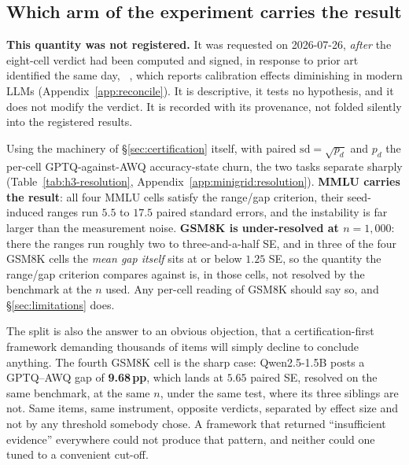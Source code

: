\subsection{Which arm of the experiment carries the result}
\label{sec:minigrid:resolution}

\textbf{This quantity was not registered.} It was requested on 2026-07-26,
\emph{after} the eight-cell verdict had been computed and signed, in response to
prior art identified the same day,%
\ \citet{paglieri2024outliers}, which reports calibration effects diminishing in
modern LLMs (Appendix~\ref{app:reconcile}). It is descriptive, it tests no
hypothesis, and it does not modify the verdict. It is recorded with its
provenance, not folded silently into the registered results.

Using the machinery of \S\ref{sec:certification} itself, with paired
$\mathrm{sd} = \sqrt{p_d}$ and $p_d$ the per-cell GPTQ-against-AWQ
accuracy-state churn, the two tasks separate sharply
(Table~\ref{tab:h3-resolution}, Appendix~\ref{app:minigrid:resolution}).
\textbf{MMLU carries the result}: all four MMLU cells satisfy the range/gap
criterion, their seed-induced ranges run $5.5$ to $17.5$ paired standard errors,
and the instability is far larger than the measurement noise.
\textbf{GSM8K is under-resolved at $n = 1{,}000$}: there the ranges run roughly
two to three-and-a-half SE, and in three of the four GSM8K cells the \emph{mean
gap itself} sits at or below $1.25$ SE, so the quantity the range/gap criterion
compares against is, in those cells, not resolved by the benchmark at the $n$
used. Any per-cell reading of GSM8K should say so, and \S\ref{sec:limitations}
does.

The split is also the answer to an obvious objection, that a certification-first
framework demanding thousands of items will simply decline to conclude anything.
The fourth GSM8K cell is the sharp case: Qwen2.5-1.5B posts a GPTQ--AWQ gap of
\textbf{9.68\,pp}, which lands at $5.65$ paired SE, resolved on the same
benchmark, at the same $n$, under the same test, where its three siblings are
not. Same items, same instrument, opposite verdicts, separated by effect size
and not by any threshold somebody chose. A framework that returned
``insufficient evidence'' everywhere could not produce that pattern, and neither
could one tuned to a convenient cut-off.

